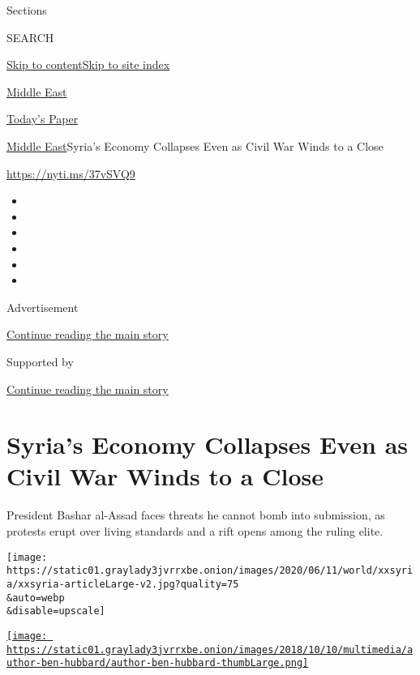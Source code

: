 Sections

SEARCH

\protect\hyperlink{site-content}{Skip to
content}\protect\hyperlink{site-index}{Skip to site index}

\href{https://www.nytimes3xbfgragh.onion/section/world/middleeast}{Middle
East}

\href{https://myaccount.nytimes3xbfgragh.onion/auth/login?response_type=cookie\&client_id=vi}{}

\href{https://www.nytimes3xbfgragh.onion/section/todayspaper}{Today's
Paper}

\href{/section/world/middleeast}{Middle East}\textbar{}Syria's Economy
Collapses Even as Civil War Winds to a Close

\url{https://nyti.ms/37vSVQ9}

\begin{itemize}
\item
\item
\item
\item
\item
\item
\end{itemize}

Advertisement

\protect\hyperlink{after-top}{Continue reading the main story}

Supported by

\protect\hyperlink{after-sponsor}{Continue reading the main story}

\hypertarget{syrias-economy-collapses-even-as-civil-war-winds-to-a-close}{%
\section{Syria's Economy Collapses Even as Civil War Winds to a
Close}\label{syrias-economy-collapses-even-as-civil-war-winds-to-a-close}}

President Bashar al-Assad faces threats he cannot bomb into submission,
as protests erupt over living standards and a rift opens among the
ruling elite.

\texttt{[image: https://static01.graylady3jvrrxbe.onion/images/2020/06/11/world/xxsyria/xxsyria-articleLarge-v2.jpg?quality=75\\\&auto=webp\\\&disable=upscale]}

\href{https://www.nytimes3xbfgragh.onion/by/ben-hubbard}{\texttt{[image: https://static01.graylady3jvrrxbe.onion/images/2018/10/10/multimedia/author-ben-hubbard/author-ben-hubbard-thumbLarge.png]}}

